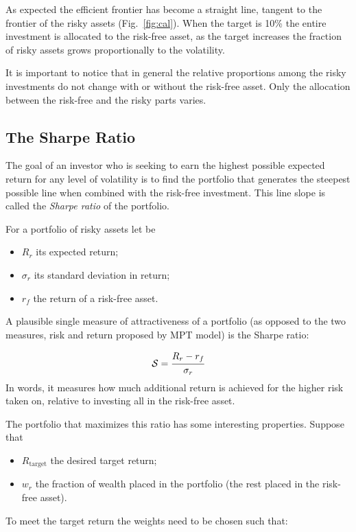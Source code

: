 As expected the efficient frontier has become a straight line, tangent to the frontier of the risky assets (Fig.~\ref{fig:cal}). When the target is 10\% the entire investment is allocated to the risk-free asset, as the target increases the fraction of risky assets grows proportionally to the volatility. 

It is important to notice that in general the relative proportions among the risky investments do not change with or without the risk-free asset. Only the allocation between the risk-free and the risky parts varies.

\subsection{The Sharpe Ratio}
\label{the-sharpe-ratio}
The goal of an investor who is seeking to earn the highest possible expected return for any level of volatility is to find the portfolio that generates the steepest possible line when combined with the risk-free investment. This line slope is called the \emph{Sharpe ratio} of the portfolio.

For a portfolio of risky assets let be

\begin{itemize}
\tightlist
\item \(R_r\) its expected return;
\item \(\sigma_r\) its standard deviation in return;
\item \(r_f\) the return of a risk-free asset.
\end{itemize}

A plausible single measure of attractiveness of a portfolio (as opposed to the two measures, risk and return proposed by MPT model) is the Sharpe ratio:

\begin{equation} 
\mathcal{S} = \cfrac{R_r - r_f}{\sigma_r} 
\end{equation}
\noindent
In words, it measures how much additional return is achieved for the higher risk taken on, relative to investing all in the risk-free asset. 

The portfolio that maximizes this ratio has some interesting properties. Suppose that

\begin{itemize}
\tightlist
\item
  \(R_\textrm{target}\) the desired target return;
\item
  \(w_r\) the fraction of wealth placed in the portfolio (the rest placed in the risk-free asset).
\end{itemize}
\noindent
To meet the target return the weights need to be chosen such that:

